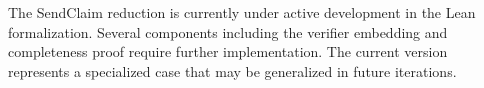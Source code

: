 \begin{remark}
    The SendClaim reduction is currently under active development in the Lean formalization. Several components including the verifier embedding and completeness proof require further implementation. The current version represents a specialized case that may be generalized in future iterations.
\end{remark}
